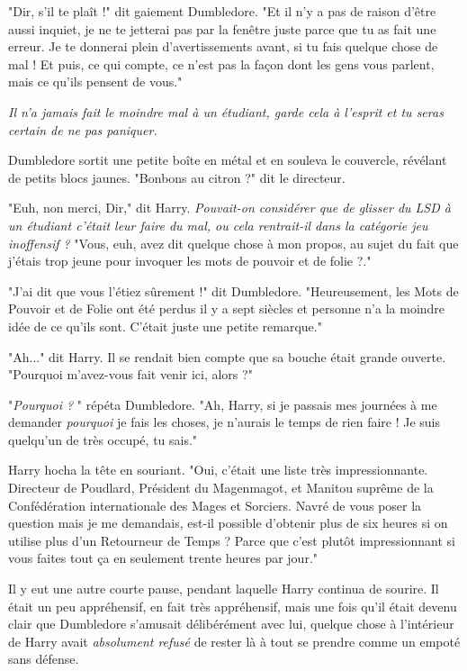 "Dir, s'il te plaît !" dit gaiement Dumbledore. "Et il n'y a pas de raison d'être aussi inquiet, je ne te jetterai pas par la fenêtre juste parce que tu as fait une erreur. Je te donnerai plein d'avertissements avant, si tu fais quelque chose de mal ! Et puis, ce qui compte, ce n'est pas la façon dont les gens vous parlent, mais ce qu'ils pensent de vous."

\emph{Il n'a jamais fait le moindre mal à un étudiant, garde cela à l'esprit et tu seras certain de ne pas paniquer.} 

Dumbledore sortit une petite boîte en métal et en souleva le couvercle, révélant de petits blocs jaunes. "Bonbons au citron ?" dit le directeur.

"Euh, non merci, Dir," dit Harry. \emph{Pouvait-on considérer que de glisser du LSD à un étudiant c'était leur faire du mal, ou cela rentrait-il dans la catégorie jeu inoffensif ? } "Vous, euh, avez dit quelque chose à mon propos, au sujet du fait que j'étais trop jeune pour invoquer les mots de pouvoir et de folie ?."

"J'ai dit que vous l'étiez sûrement !" dit Dumbledore. "Heureusement, les Mots de Pouvoir et de Folie ont été perdus il y a sept siècles et personne n'a la moindre idée de ce qu'ils sont. C'était juste une petite remarque."

"Ah..." dit Harry. Il se rendait bien compte que sa bouche était grande ouverte. "Pourquoi m'avez-vous fait venir ici, alors ?"

"\emph{Pourquoi ?} " répéta Dumbledore. "Ah, Harry, si je passais mes journées à me demander \emph{pourquoi}  je fais les choses, je n'aurais le temps de rien faire ! Je suis quelqu'un de très occupé, tu sais."

Harry hocha la tête en souriant. "Oui, c'était une liste très impressionnante. Directeur de Poudlard, Président du Magenmagot, et Manitou suprême de la Confédération internationale des Mages et Sorciers. Navré de vous poser la question mais je me demandais, est-il possible d'obtenir plus de six heures si on utilise plus d'un Retourneur de Temps ? Parce que c'est plutôt impressionnant si vous faites tout ça en seulement trente heures par jour."

Il y eut une autre courte pause, pendant laquelle Harry continua de sourire. Il était un peu appréhensif, en fait très appréhensif, mais une fois qu'il était devenu clair que Dumbledore s'amusait délibérément avec lui, quelque chose à l'intérieur de Harry avait \emph{absolument refusé } de rester là à tout se prendre comme un empoté sans défense.


